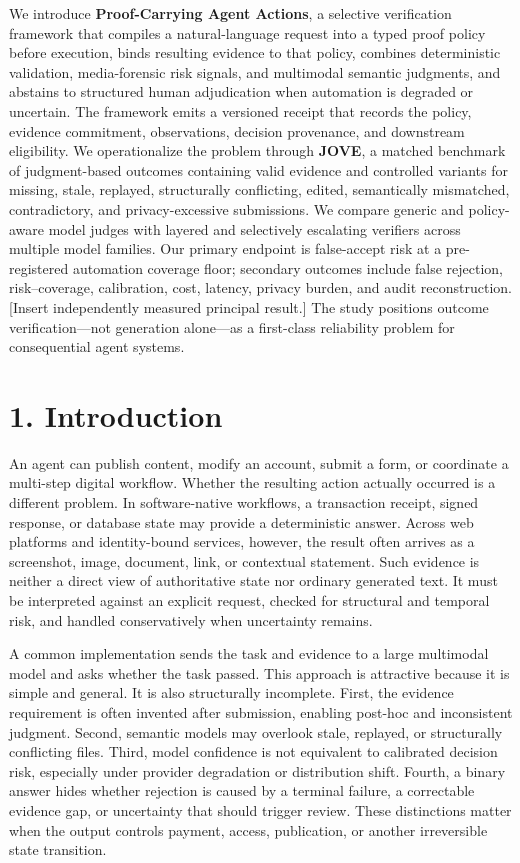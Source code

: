 \documentclass[11pt]{article}
\begin{document}
We introduce \textbf{Proof-Carrying Agent Actions}, a selective verification framework that compiles a natural-language request into a typed proof policy before execution, binds resulting evidence to that policy, combines deterministic validation, media-forensic risk signals, and multimodal semantic judgments, and abstains to structured human adjudication when automation is degraded or uncertain. The framework emits a versioned receipt that records the policy, evidence commitment, observations, decision provenance, and downstream eligibility. We operationalize the problem through \textbf{JOVE}, a matched benchmark of judgment-based outcomes containing valid evidence and controlled variants for missing, stale, replayed, structurally conflicting, edited, semantically mismatched, contradictory, and privacy-excessive submissions. We compare generic and policy-aware model judges with layered and selectively escalating verifiers across multiple model families. Our primary endpoint is false-accept risk at a pre-registered automation coverage floor; secondary outcomes include false rejection, risk--coverage, calibration, cost, latency, privacy burden, and audit reconstruction. [Insert independently measured principal result.] The study positions outcome verification---not generation alone---as a first-class reliability problem for consequential agent systems.\par

\section{1. Introduction}

An agent can publish content, modify an account, submit a form, or coordinate a multi-step digital workflow. Whether the resulting action actually occurred is a different problem. In software-native workflows, a transaction receipt, signed response, or database state may provide a deterministic answer. Across web platforms and identity-bound services, however, the result often arrives as a screenshot, image, document, link, or contextual statement. Such evidence is neither a direct view of authoritative state nor ordinary generated text. It must be interpreted against an explicit request, checked for structural and temporal risk, and handled conservatively when uncertainty remains.\par

A common implementation sends the task and evidence to a large multimodal model and asks whether the task passed. This approach is attractive because it is simple and general. It is also structurally incomplete. First, the evidence requirement is often invented after submission, enabling post-hoc and inconsistent judgment. Second, semantic models may overlook stale, replayed, or structurally conflicting files. Third, model confidence is not equivalent to calibrated decision risk, especially under provider degradation or distribution shift. Fourth, a binary answer hides whether rejection is caused by a terminal failure, a correctable evidence gap, or uncertainty that should trigger review. These distinctions matter when the output controls payment, access, publication, or another irreversible state transition.\par
\end{document}
